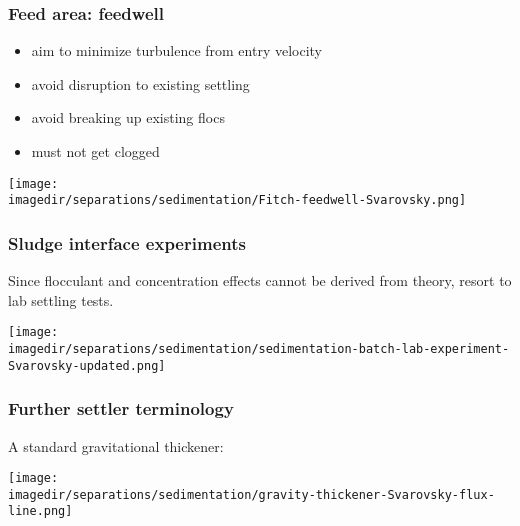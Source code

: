 \begin{frame}\frametitle{Feed area: feedwell}
	\begin{itemize}
		\item	aim to minimize turbulence from entry velocity
		\item	avoid disruption to existing settling
		\item	avoid breaking up existing flocs
		\item	must not get clogged
	\end{itemize}

	\begin{center}
		\texttt{[image: \\imagedir/separations/sedimentation/Fitch-feedwell-Svarovsky.png]}
	\end{center}
\end{frame}

\begin{frame}\frametitle{Sludge interface experiments}
	Since flocculant and concentration effects cannot be derived from theory, resort to lab settling tests.
	\begin{center}
		\texttt{[image: \\imagedir/separations/sedimentation/sedimentation-batch-lab-experiment-Svarovsky-updated.png]}
	\end{center}
\end{frame}

\begin{frame}\frametitle{Further settler terminology}
	A standard gravitational thickener:

	\vspace{12pt}
	\begin{center}
		\texttt{[image: \\imagedir/separations/sedimentation/gravity-thickener-Svarovsky-flux-line.png]}
	\end{center}
\end{frame}

% 


